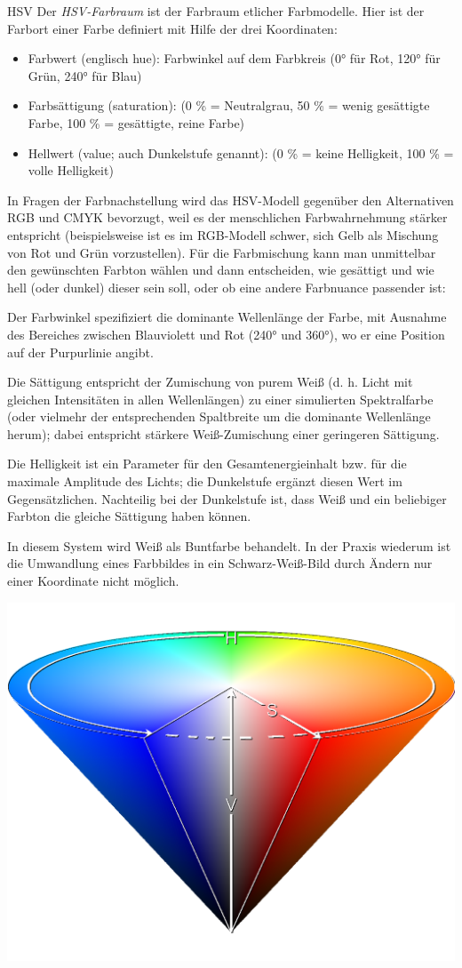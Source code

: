\begin{defi}[Farbmodell]{HSV}
    Der \emph{HSV-Farbraum} ist der Farbraum etlicher Farbmodelle.
    Hier ist der Farbort einer Farbe definiert mit Hilfe der drei Koordinaten:
    \begin{itemize}
        \item Farbwert (englisch hue): Farbwinkel auf dem Farbkreis (0° für Rot, 120° für Grün, 240° für Blau)
        \item Farbsättigung (saturation): (0 \% = Neutralgrau, 50 \% = wenig gesättigte Farbe, 100 \% = gesättigte, reine Farbe)
        \item Hellwert (value; auch Dunkelstufe genannt): (0 \% = keine Helligkeit, 100 \% = volle Helligkeit)
    \end{itemize}

    In Fragen der Farbnachstellung wird das HSV-Modell gegenüber den Alternativen RGB und CMYK bevorzugt, weil es der menschlichen Farbwahrnehmung stärker entspricht (beispielsweise ist es im RGB-Modell schwer, sich Gelb als Mischung von Rot und Grün vorzustellen).
    Für die Farbmischung kann man unmittelbar den gewünschten Farbton wählen und dann entscheiden, wie gesättigt und wie hell (oder dunkel) dieser sein soll, oder ob eine andere Farbnuance passender ist:

    Der Farbwinkel spezifiziert die dominante Wellenlänge der Farbe, mit Ausnahme des Bereiches zwischen Blauviolett und Rot (240° und 360°), wo er eine Position auf der Purpurlinie angibt.

    Die Sättigung entspricht der Zumischung von purem Weiß (d. h. Licht mit gleichen Intensitäten in allen Wellenlängen) zu einer simulierten Spektralfarbe (oder vielmehr der entsprechenden Spaltbreite um die dominante Wellenlänge herum);
    dabei entspricht stärkere Weiß-Zumischung einer geringeren Sättigung.

    Die Helligkeit ist ein Parameter für den Gesamtenergieinhalt bzw. für die maximale Amplitude des Lichts;
    die Dunkelstufe ergänzt diesen Wert im Gegensätzlichen.
    Nachteilig bei der Dunkelstufe ist, dass Weiß und ein beliebiger Farbton die gleiche Sättigung haben können.

    In diesem System wird Weiß als Buntfarbe behandelt.
    In der Praxis wiederum ist die Umwandlung eines Farbbildes in ein Schwarz-Weiß-Bild durch Ändern nur einer Koordinate nicht möglich.

    \centering
    \includegraphics[width=.4\linewidth]{figures/HSV_cone.png}
\end{defi}

